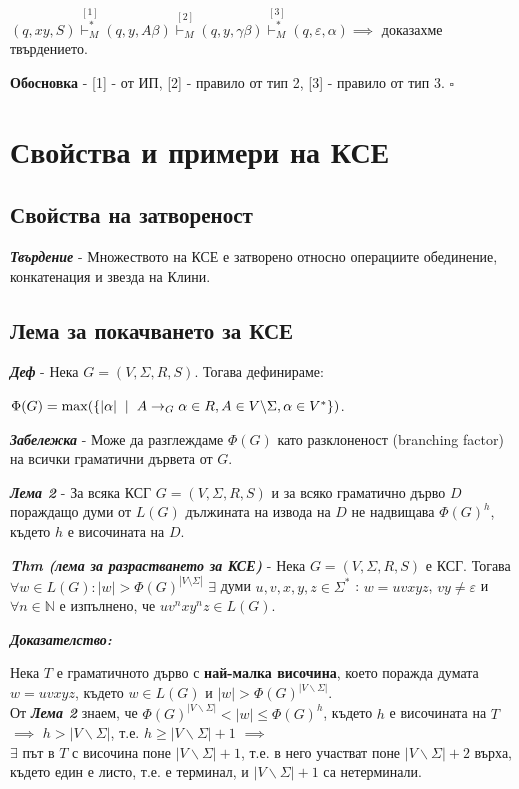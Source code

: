 \documentclass[fleqn,12pt]{article}
\DeclareMathOperator{\mmax}{max}
\begin{document}
\begin{flushleft}
$(q, xy, S) \overset{[1]}{\vdash_M^*} (q, y, A\beta) \overset{[2]}{\vdash_M} (q, y, \gamma\beta) \overset{[3]}{\vdash_M^*} (q, \varepsilon, \alpha) \implies$ доказахме твърдението.

\textbf{Обосновка} - [1] - от ИП, [2] - правило от тип 2, [3] - правило от тип 3. $\square$

\section{Свойства и примери на КСЕ}

\subsection{Свойства на затвореност}

\textit{\textbf{Твърдение}} - Множеството на КСЕ е затворено относно операциите обединение, конкатенация и звезда на Клини.

\subsection{Лема за покачването за КСЕ}

\textit{\textbf{Деф}} - Нека $G = (V, \Sigma, R, S)$. Тогава дефинираме: 

$\Phi(G) = \mmax(\{|\alpha| \hspace{2mm} | \hspace{2mm} A \to_G \alpha \in R, A \in V \backslash \Sigma, \alpha \in V^*\})$.

\textit{\textbf{Забележка}} - Може да разглеждаме $\Phi(G)$ като разклоненост (branching factor) на всички граматични дървета от $G$.

\textit{\textbf{Лема 2}} - За всяка КСГ $G = (V, \Sigma, R, S)$ и за всяко граматично дърво $D$ пораждащо думи от $L(G)$ дължината на извода на $D$ не надвищава $\Phi(G)^h$, където $h$ е височината на $D$.

\textit{\textbf{Thm (лема за разрастването за КСЕ)}} - Нека $G = (V, \Sigma, R, S)$ е КСГ. 
Тогава $\forall w \in L(G): |w| > \Phi(G)^{|V \setminus \Sigma|}$  $\exists$ думи $u, v, x, y, z \in \Sigma^*$ : $w=uvxyz$, $vy \neq \varepsilon$ и $\forall n \in \mathbb{N}$ е изпълнено, че $uv^nxy^nz \in L(G)$.

\textit{\textbf{Доказателство:}}

Нека $T$ е граматичното дърво с \textbf{най-малка височина}, което поражда думата $w = uvxyz$, където $w \in L(G)$ и $|w| > \Phi(G)^{|V \backslash \Sigma|}$. \\
От \textit{\textbf{Лема 2}} знаем, че $\Phi(G)^{|V \backslash \Sigma|} < |w| \leq \Phi(G)^h$, където $h$ е височината на $T$ $\implies$ $h > |V \backslash \Sigma|$, т.е. $h \geq |V \backslash \Sigma| + 1$ $\implies$ \\
$\exists$ път в $T$ с височина поне $|V \backslash \Sigma| + 1$, т.е. в него участват поне $|V \backslash \Sigma| + 2$ върха, където един е листо, т.е. е терминал, и $|V \backslash \Sigma| + 1$ са нетерминали.


\end{flushleft}
\end{document}
